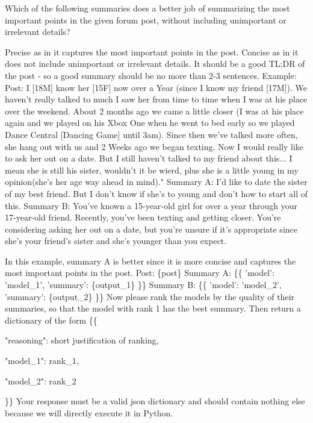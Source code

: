\begin{tcolorbox}[breakable]

Which of the following summaries does a better job of summarizing the most
important points in the given forum post, without including unimportant
or irrelevant details?

\bigbreak
Precise as in it captures the most important points in the post.
Concise as in it does not include unimportant or irrelevant details. It should be a good TL;DR of the post - so a good summary should be no more than 2-3 sentences.
\bigbreak
Example:
\bigbreak
Post: I [18M] know her [15F] now over a Year (since I know my friend [17M]). We haven't really talked to much I saw her from time to time when I was at his place over the weekend. About 2 months ago we came a little closer (I was at his place again and we played on his Xbox One when he went to bed early so we played Dance Central [Dancing Game] until 3am). Since then we've talked more often, she hang out with us and 2 Weeks ago we began texting. Now I would really like to ask her out on a date. But I still haven't talked to my friend about this... I mean she is still his sister, wouldn't it be wierd, plus she is a little young in my opinion(she's her age way ahead in mind)."
\bigbreak
Summary A: I'd like to date the sister of my best friend. But I don't know if she's to young and don't how to start all of this.
\bigbreak
Summary B: You've known a 15-year-old girl for over a year through your 17-year-old friend. Recently, you've been texting and getting closer. You're considering asking her out on a date, but you're unsure if it's appropriate since she's your friend's sister and she's younger than you expect.

\bigbreak
In this example, summary A is better since it is more concise and captures the most important points in the post.
\bigbreak
Post: \{post\}
\bigbreak
Summary A:
\{\{
    'model': 'model\_1',
    'summary': \{output\_1\}
\}\}
\bigbreak
Summary B: 
\{\{
    'model': 'model\_2',
    'summary': \{output\_2\}
\}\}
\bigbreak
Now please rank the models by the quality of their summaries, so that the
model with rank 1 has the best summary. Then return a dictionary of the form
\bigbreak
\{\{

    "reasoning": short justification of ranking, 
    
    "model\_1": rank\_1,
    
    "model\_2": rank\_2
    
\}\}
\bigbreak
Your response must be a valid json dictionary and should contain nothing else because we will directly execute it in Python.

\end{tcolorbox}


